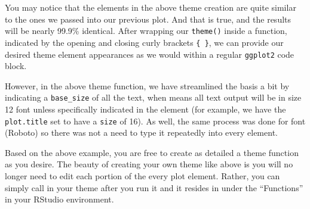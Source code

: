 \documentclass[
  letterpaper,
]{krantz}
\begin{document}
You may notice that the elements in the above theme creation are quite
similar to the ones we passed into our previous plot. And that is true,
and the results will be nearly 99.9\% identical. After wrapping our
\texttt{theme()} inside a function, indicated by the opening and closing
curly brackets \texttt{\{\ \}}, we can provide our desired theme element
appearances as we would within a regular \texttt{ggplot2} code block.

However, in the above theme function, we have streamlined the basis a
bit by indicating a \texttt{base\_size} of all the text, when means all
text output will be in size 12 font unless specifically indicated in the
element (for example, we have the \texttt{plot.title} set to have a
\texttt{size} of 16). As well, the same process was done for font
(Roboto) so there was not a need to type it repeatedly into every
element.

Based on the above example, you are free to create as detailed a theme
function as you desire. The beauty of creating your own theme like above
is you will no longer need to edit each portion of the every plot
element. Rather, you can simply call in your theme after you run it and
it resides in under the ``Functions'' in your RStudio environment.
\end{document}
